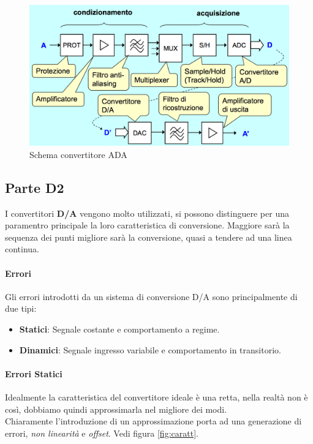 \documentclass[12pt]{article}
\begin{document}
\begin{figure}[!hpt]
  \includegraphics[width=\textwidth]{images/ada.png}
  \caption{Schema convertitore ADA}
  \label{fig:ada}
\end{figure}

\subsection{Parte D2}\label{d2}
I convertitori \textbf{D/A} vengono molto utilizzati, si possono distinguere per una paramentro principale la loro caratteristica di conversione. Maggiore sarà la sequenza dei punti migliore sarà la conversione, quasi a tendere ad una linea continua.
\paragraph{Errori} Gli errori introdotti da un sistema di conversione D/A sono principalmente di due tipi:
\begin{itemize}
  \item \textbf{Statici}: Segnale costante e comportamento a regime.
  \item \textbf{Dinamici}: Segnale ingresso variabile e comportamento in transitorio.
\end{itemize} %

\paragraph{Errori Statici} Idealmente la caratteristica del convertitore ideale è una retta, nella realtà non è così, dobbiamo quindi approssimarla nel migliore dei modi.\\
Chiaramente l'introduzione di un approssimazione porta ad una generazione di errori, \textit{non linearità} e \textit{offset}. Vedi figura \ref{fig:caratt}.
\end{document}
